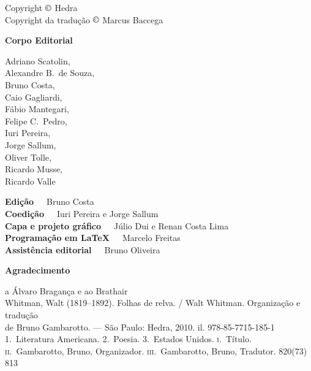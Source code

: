 
\begingroup
\parindent0mm\parskip0mm
\footnotesize
\thispagestyle{empty}

Copyright $\copyright$ Hedra \the\year\\
Copyright da tradução $\copyright$ Marcus Baccega\\
\medskip

\textbf{Corpo Editorial}

Adriano Scatolin,\\
Alexandre B.~de Souza,\\
Bruno Costa,\\
Caio Gagliardi,\\
Fábio Mantegari,\\
Felipe C.~Pedro,\\
Iuri Pereira,\\
Jorge Sallum,\\
Oliver Tolle,\\
Ricardo Musse,\\
Ricardo Valle\smallskip

\textbf{Edição}\ \ \  Bruno Costa\\
\textbf{Coedição}\ \ \ Iuri Pereira e Jorge Sallum\\
\textbf{Capa e projeto gráfico}\ \ \  Júlio Dui e Renan Costa Lima\\
\textbf{Programação em \LaTeX}\ \ \  Marcelo Freitas\\
\textbf{Assistência editorial}\ \ \  Bruno Oliveira\smallskip

\textbf{Agradecimento}

a Álvaro Bragança e ao Brathair\\

{Whitman, Walt (1819--1892).}
{Folhas de relva. / Walt Whitman. Organização e tradução\\ de Bruno Gambarotto. --- São Paulo: Hedra, 2010. il.}
{978-85-7715-185-1}
{1.~Literatura Americana. 2.~Poesia. 3.~Estados Unidos. \textsc{i}.~Título.\\
\textsc{ii}.~Gambarotto, Bruno, Organizador. \textsc{iii}.~Gambarotto, Bruno, Tradutor.}
{820(73)}
{813}

\vfill
\pagebreak 

\endgroup
